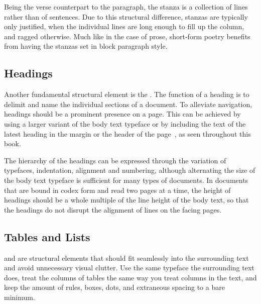 Being the verse counterpart to the paragraph, the stanza is a collection of
lines rather than of sentences. Due to this structural difference, stanzas are
typically only justified, when the individual lines are long enough to fill up
the column, and ragged otherwise. Much like in the case of prose, short-form
poetry benefits from having the stanzas set in block paragraph style.

\subsection{Headings}
Another fundamental structural element is the . The function of a
heading is to delimit and name the individual sections of a document. To
alleviate navigation, headings should be a prominent presence on a page. This
can be achieved by using a larger variant of the body text typeface or by
including the text of the latest heading in the margin or the header of the
page~\cite[sec.\,4.2.1]{bringhurst92}, as seen throughout this book.

The hierarchy of the headings can be expressed through the variation of
typefaces, indentation, alignment and numbering, although alternating the size
of the body text typeface is sufficient for many types of documents. In
documents that are bound in codex form and read two pages at a time, the height
of headings should be a whole multiple of the line height of the body text, so
that the headings do not disrupt the alignment of lines on the facing
pages.~\cite[para.\,33]{kapr99}


\subsection{Tables and Lists}
 and  are structural elements that should fit
seamlessly into the surrounding text and avoid unnecessary visual clutter. Use
the same typeface the surrounding text does, treat the columns of tables the
same way you treat columns in the text, and keep the amount of rules, boxes,
dots, and extraneous spacing to a bare minimum.~\cite[sec.\,2.1.10 and
4.4]{bringhurst92}


